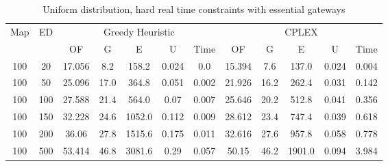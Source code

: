 \begin{table}[htb]
	\centering
	\begin{tabular}{|c|c|c|c|c|c|c|c|c|c|c|c|}
		\hline
		\multirow{2}{*}{Map} & \multirow{2}{*}{ED} & \multicolumn{5}{c|}{Greedy Heuristic} & \multicolumn{5}{c|}{CPLEX}\\ 
		\cline{3-12}
&& OF & G & E & U & Time & OF & G & E & U & Time\\ 
		\hline
		100 & 20 & 17.056 & 8.2 & 158.2 & 0.024 & 0.0 & 15.394 & 7.6 & 137.0 & 0.024 & 0.004 \\ 
		100 & 50 & 25.096 & 17.0 & 364.8 & 0.051 & 0.002 & 21.926 & 16.2 & 262.4 & 0.031 & 0.142 \\ 
		100 & 100 & 27.588 & 21.4 & 564.0 & 0.07 & 0.007 & 25.646 & 20.2 & 512.8 & 0.041 & 0.356 \\ 
		100 & 150 & 32.228 & 24.6 & 1052.0 & 0.112 & 0.009 & 28.612 & 23.4 & 747.4 & 0.039 & 0.618 \\ 
		100 & 200 & 36.06 & 27.8 & 1515.6 & 0.175 & 0.011 & 32.616 & 27.6 & 957.8 & 0.058 & 0.778 \\ 
		100 & 500 & 53.414 & 46.8 & 3081.6 & 0.29 & 0.057 & 50.15 & 46.2 & 1901.0 & 0.094 & 3.984 \\ 
		\hline 
	\end{tabular} 
	\caption{Uniform distribution, hard real time constraints with essential gateways} 
	\label{tab:unif_hard_esc} 
\end{table} 

